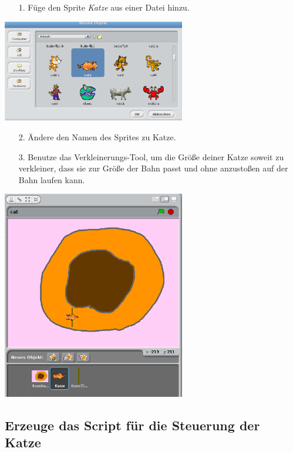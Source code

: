 \begin{itemize}
\item[1.] Füge den Sprite \emph{Katze} aus einer Datei hinzu.
\end{itemize}
\includegraphics[width=0.6\textwidth]{images/aufgabe4_katze_sprite.png}
\begin{itemize}
\item[2. ] Ändere den Namen des Sprites zu Katze.
\end{itemize}
\begin{itemize}
\item[3.] Benutze das Verkleinerungs-Tool, um die Größe deiner Katze soweit zu verkleiner, dass sie zur Größe der Bahn passt und ohne anzustoßen auf der Bahn laufen kann.
\end{itemize}
\includegraphics[width=0.6\textwidth]{images/aufgabe4_katze_schrumpfen.png}

\subsection{Erzeuge das Script für die Steuerung der Katze}

